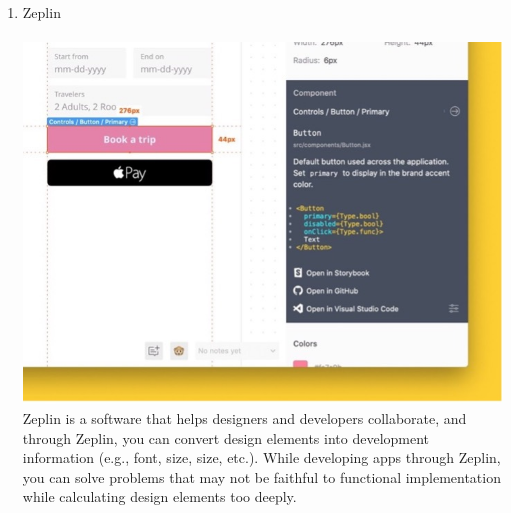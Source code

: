 \documentclass[conference]{IEEEtran}
\begin{document}
\begin{enumerate}
    \item Zeplin\\ \\
    \includegraphics[scale=0.32]{assets/Zp.jpg}
    Zeplin is a software that helps designers and developers collaborate, and through Zeplin, you can convert design elements into development information (e.g., font, size, size, etc.). While developing apps through Zeplin, you can solve problems that may not be faithful to functional implementation while calculating design elements too deeply. 
    
\end{enumerate}{}
\end{document}
